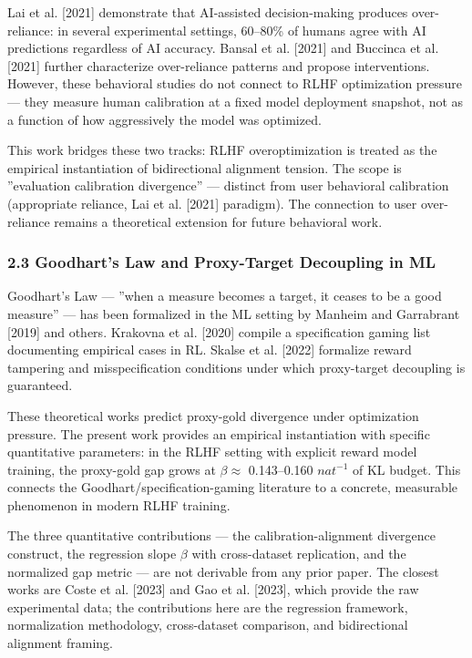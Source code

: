Lai et al. [2021] demonstrate that AI-assisted decision-making produces over-reliance: in several experimental settings, 60--80\% of humans agree with AI predictions regardless of AI accuracy. Bansal et al. [2021] and Buccinca et al. [2021] further characterize over-reliance patterns and propose interventions. However, these behavioral studies do not connect to RLHF optimization pressure --- they measure human calibration at a fixed model deployment snapshot, not as a function of how aggressively the model was optimized.

This work bridges these two tracks: RLHF overoptimization is treated as the empirical instantiation of bidirectional alignment tension. The scope is ''evaluation calibration divergence'' --- distinct from user behavioral calibration (appropriate reliance, Lai et al. [2021] paradigm). The connection to user over-reliance remains a theoretical extension for future behavioral work.

\subsubsection{2.3 Goodhart's Law and Proxy-Target Decoupling in ML}

Goodhart's Law --- ''when a measure becomes a target, it ceases to be a good measure'' --- has been formalized in the ML setting by Manheim and Garrabrant [2019] and others. Krakovna et al. [2020] compile a specification gaming list documenting empirical cases in RL. Skalse et al. [2022] formalize reward tampering and misspecification conditions under which proxy-target decoupling is guaranteed.

These theoretical works predict proxy-gold divergence under optimization pressure. The present work provides an empirical instantiation with specific quantitative parameters: in the RLHF setting with explicit reward model training, the proxy-gold gap grows at $\beta \approx$ 0.143--0.160 $nat^{-1}$ of KL budget. This connects the Goodhart/specification-gaming literature to a concrete, measurable phenomenon in modern RLHF training.

The three quantitative contributions --- the calibration-alignment divergence construct, the regression slope $\beta$ with cross-dataset replication, and the normalized gap metric --- are not derivable from any prior paper. The closest works are Coste et al. [2023] and Gao et al. [2023], which provide the raw experimental data; the contributions here are the regression framework, normalization methodology, cross-dataset comparison, and bidirectional alignment framing.

